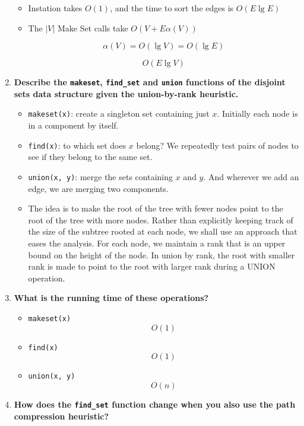 \documentclass[a4paper,11pt]{article}
\begin{document}
\begin{enumerate}
  \begin{itemize}
  \item
    Instation takes $O(1)$, and the time to sort the edges is
    $O(E \lg E)$
  \item
    The $|V|$ Make Set calls take $O(V + E \alpha (V))$

    \[\alpha (V) = O(\lg V) = O(\lg E)\]

    \[O(E \lg V)\]
  \end{itemize}
\item
  \textbf{Describe the \texttt{makeset}, \texttt{find\_set} and
  \texttt{union} functions of the disjoint sets data structure given the
  union-by-rank heuristic.}

  \begin{itemize}
  \item
    \texttt{makeset(x)}: create a singleton set containing just $x$.
    Initially each node is in a component by itself.
  \item
    \texttt{find(x)}: to which set does $x$ belong? We repeatedly test
    pairs of nodes to see if they belong to the same set.
  \item
    \texttt{union(x, y)}: merge the sets containing $x$ and $y$. And
    wherever we add an edge, we are merging two components.
  \item
    The idea is to make the root of the tree with fewer nodes point to
    the root of the tree with more nodes. Rather than explicitly keeping
    track of the size of the subtree rooted at each node, we shall use
    an approach that eases the analysis. For each node, we maintain a
    rank that is an upper bound on the height of the node. In union by
    rank, the root with smaller rank is made to point to the root with
    larger rank during a UNION operation.
  \end{itemize}
\item
  \textbf{What is the running time of these operations?}

  \begin{itemize}
  \itemsep1pt\parskip0pt
  \item
    \texttt{makeset(x)} \[O(1)\]
  \item
    \texttt{find(x)} \[O(1)\]
  \item
    \texttt{union(x, y)} \[O(n)\]
  \end{itemize}
\item
  \textbf{How does the \texttt{find\_set} function change when you also
  use the path compression heuristic?}


\end{enumerate}
\end{document}
